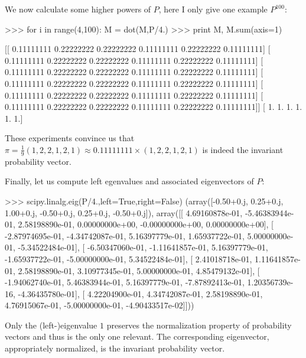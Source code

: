 \documentclass[8pt,notitlepage]{report}
\newenvironment{solution}[1][Solution]{\begin{trivlist}
    \item[\hskip \labelsep {\bfseries #1}]}{\end{trivlist}}
\begin{document}
\begin{solution}
We now calculate some higher powers of $P$, here I only give one example $P^{100}$:

\small
\begin{verbatimtab}[4]
>>> for i in range(4,100):
		M = dot(M,P/4.)
>>> print M, M.sum(axis=1)

[[ 0.11111111  0.22222222  0.22222222  0.11111111  0.22222222  0.11111111]
 [ 0.11111111  0.22222222  0.22222222  0.11111111  0.22222222  0.11111111]
 [ 0.11111111  0.22222222  0.22222222  0.11111111  0.22222222  0.11111111]
 [ 0.11111111  0.22222222  0.22222222  0.11111111  0.22222222  0.11111111]
 [ 0.11111111  0.22222222  0.22222222  0.11111111  0.22222222  0.11111111]
 [ 0.11111111  0.22222222  0.22222222  0.11111111  0.22222222  0.11111111]]
[ 1.  1.  1.  1.  1.  1.]
\end{verbatimtab}
\normalsize

These experiments convince us that $\pi = \frac{1}{9} ( 1,2,2,1,2,1 ) \approx 0.11111111 \times (1,2,2,1,2,1) $
is indeed the invariant probability vector. 

Finally, let us compute left egenvalues and associated eigenvectors of $P$:
\begin{verbatimtab}[4]
>>> scipy.linalg.eig(P/4.,left=True,right=False)
(array([-0.50+0.j,  0.25+0.j,  1.00+0.j, -0.50+0.j,  0.25+0.j, -0.50+0.j]),
array([[  4.69160878e-01,  -5.46383944e-01,   2.58198890e-01,
          0.00000000e+00,  -0.00000000e+00,   0.00000000e+00],
       [ -2.87974695e-01,  -4.34742087e-01,   5.16397779e-01,
          1.65937722e-01,   5.00000000e-01,  -5.34522484e-01],
       [ -6.50347060e-01,  -1.11641857e-01,   5.16397779e-01,
         -1.65937722e-01,  -5.00000000e-01,   5.34522484e-01],
       [  2.41018718e-01,   1.11641857e-01,   2.58198890e-01,
          3.10977345e-01,   5.00000000e-01,   4.85479132e-01],
       [ -1.94062740e-01,   5.46383944e-01,   5.16397779e-01,
         -7.87892413e-01,   1.20356739e-16,  -4.36435780e-01],
       [  4.22204900e-01,   4.34742087e-01,   2.58198890e-01,
          4.76915067e-01,  -5.00000000e-01,  -4.90433517e-02]]))
\end{verbatimtab}
Only the (left-)eigenvalue $1$ preserves the normalization property of
probability vectors and thus is the only one relevant. The corresponding eigenvector, appropriately normalized,
is the invariant probability vector.


\end{solution}
\end{document}
